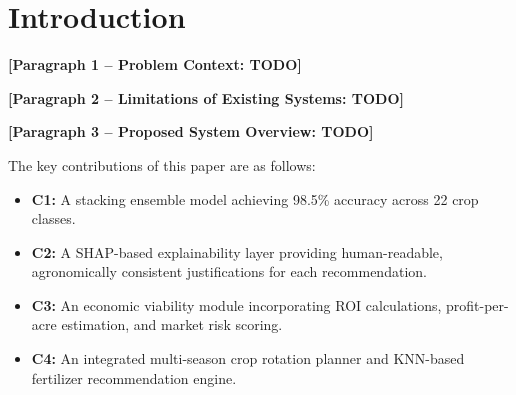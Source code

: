 \documentclass[conference]{IEEEtran}
\begin{document}
\section{Introduction}

\textbf{[Paragraph 1 -- Problem Context: TODO]}

\textbf{[Paragraph 2 -- Limitations of Existing Systems: TODO]}

\textbf{[Paragraph 3 -- Proposed System Overview: TODO]}

The key contributions of this paper are as follows:
\begin{itemize}
    \item \textbf{C1:} A stacking ensemble model achieving 98.5\% accuracy across 22 crop classes. %
    \item \textbf{C2:} A SHAP-based explainability layer providing human-readable, agronomically consistent justifications for each recommendation.
    \item \textbf{C3:} An economic viability module incorporating ROI calculations, profit-per-acre estimation, and market risk scoring.
    \item \textbf{C4:} An integrated multi-season crop rotation planner and KNN-based fertilizer recommendation engine.
\end{itemize}
\end{document}
